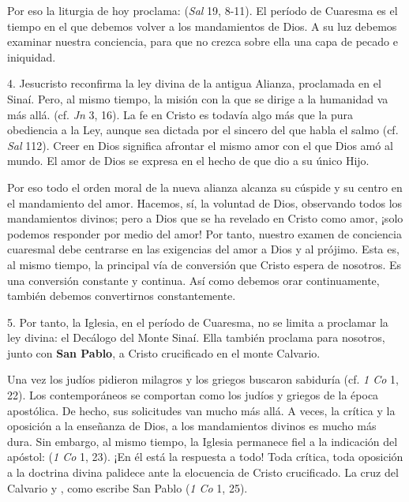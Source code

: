 \begin{body}
Por eso la liturgia de hoy proclama:   (\textit{Sal} 19, 8-11). El período de Cuaresma es el tiempo en el que debemos volver a los mandamientos de Dios. A su luz debemos examinar nuestra conciencia, para que no crezca sobre ella una capa de pecado e iniquidad.

4. Jesucristo reconfirma la ley divina de la antigua Alianza, proclamada en el Sinaí. Pero, al mismo tiempo, la misión con la que se dirige a la humanidad va más allá.  (cf. \textit{Jn} 3, 16). La fe en Cristo es todavía algo más que la pura obediencia a la Ley, aunque sea dictada por el sincero  del que habla el salmo (cf. \textit{Sal} 112). Creer en Dios significa afrontar el mismo amor con el que Dios amó al mundo. El amor de Dios se expresa en el hecho de que dio a su único Hijo.

Por eso todo el orden moral de la nueva alianza alcanza su cúspide y su centro en el mandamiento del amor. Hacemos, sí, la voluntad de Dios, observando todos los mandamientos divinos; pero a Dios que se ha revelado en Cristo como amor, ¡solo podemos responder por medio del amor! Por tanto, nuestro examen de conciencia cuaresmal debe centrarse en las exigencias del amor a Dios y al prójimo. Esta es, al mismo tiempo, la principal vía de conversión que Cristo espera de nosotros. Es una conversión constante y continua. Así como debemos orar continuamente, también debemos convertirnos constantemente.

5. Por tanto, la Iglesia, en el período de Cuaresma, no se limita a proclamar la ley divina: el Decálogo del Monte Sinaí. Ella también proclama para nosotros, junto con \textbf{San Pablo}, a Cristo crucificado en el monte Calvario.

Una vez los judíos pidieron milagros y los griegos buscaron sabiduría (cf. \textit{1 Co} 1, 22). Los contemporáneos se comportan como los judíos y griegos de la época apostólica. De hecho, sus solicitudes van mucho más allá. A veces, la crítica y la oposición a la enseñanza de Dios, a los mandamientos divinos es mucho más dura. Sin embargo, al mismo tiempo, la Iglesia permanece fiel a la indicación del apóstol:  (\textit{1 Co} 1, 23). ¡En él está la respuesta a todo! Toda crítica, toda oposición a la doctrina divina palidece ante la elocuencia de Cristo crucificado. La cruz del Calvario  y , como escribe San Pablo (\textit{1 Co} 1, 25).


\end{body}
